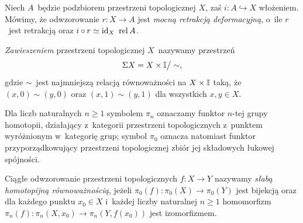 Niech $A$~będzie podzbiorem przestrzeni topologicznej $X$, zaś $i\colon A\hookrightarrow X$ włożeniem. Mówimy, że odwzorowanie $r\colon X\to A$ jest \textit{mocną retrakcją deformacyjną}, o~ile $r$~jest retrakcją oraz $i\circ r\simeq \id_X\ \operatorname{rel} A$.

\textit{Zawieszeniem} przestrzeni topologicznej $X$~nazywamy przestrzeń \[\Sigma X=X\times \mathbb{I}\big/\sim,\]gdzie $\sim$~jest najmniejszą relacją równoważności na $X\times \mathbb{I}$ taką, że $(x,0)\sim (y,0)$ oraz $(x,1)\sim (y,1)$ dla wszystkich $x,y\in X$.

Dla liczb naturalnych $n\geq 1$ symbolem $\pi_n$ oznaczamy funktor $n$-tej grupy homotopii, działający z~kategorii przestrzeni topologicznych z~punktem wyróżnionym w~kategorię grup; symbol $\pi_0$ oznacza natomiast funktor przyporządkowujący przestrzeni topologicznej zbiór jej składowych łukowej spójności.

Ciągłe odwzorowanie przestrzeni topologicznych $f\colon X\to Y$ nazywamy \textit{słabą homotopijną równoważnością}, jeżeli $\pi_0(f)\colon \pi_0(X)\to \pi_0(Y)$ jest bijekcją oraz dla każdego punktu $x_0\in X$ i~każdej liczby naturalnej $n\geq 1$ homomorfizm $\pi_n(f)\colon \pi_n(X,x_0)\to \pi_n(Y,f(x_0))$ jest izomorfizmem.

